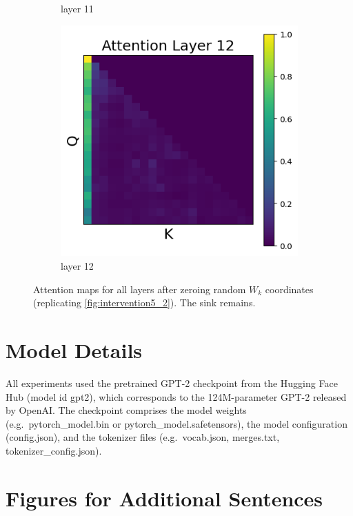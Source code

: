 \documentclass[11pt]{article}
\begin{document}
\begin{figure}[t]
\begin{subfigure}[t]{0.24\textwidth}
    \caption{layer 11}
  \end{subfigure}\hfill
  \begin{subfigure}[t]{0.24\textwidth}
    \centering
    \includegraphics[width=1.4\columnwidth]{figures/intervention5_2/layer_12.png}
    \caption{layer 12}
  \end{subfigure}\hfill

  \caption{Attention maps for all layers after zeroing random $W_k$ coordinates (replicating \cref{fig:intervention5_2}). The sink remains.}
\end{figure}

\section{Model Details}\label{app:model_details}
All experiments used the pretrained GPT-2 checkpoint from the Hugging Face Hub (model id gpt2), which corresponds to the 124M-parameter GPT-2 released by OpenAI. The checkpoint comprises the model weights (e.g.\ pytorch\_model.bin or pytorch\_model.safetensors), the model configuration (config.json), and the tokenizer files (e.g.\ vocab.json, merges.txt, tokenizer\_config.json). 

\section{Figures for Additional Sentences}
\label{app:more_examples}
\end{document}
